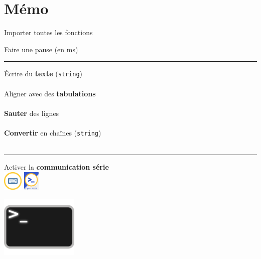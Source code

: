 \section{Mémo \mbpy}
\pagestyle{mbpy}

\begin{methode}[Essentiel]
	Importer toutes les fonctions
	~\hfill {}
	
	Faire une pause {\small(en ms)}
	\hfill {}\\
\end{methode}



\begin{minipage}[t]{0.6\linewidth}
\begin{methode}
	\rule{-0.25em}{2em}
	Écrire du \textbf{texte} (\texttt{string})
	~\hfill {}\\
	~\hfill \ex {}\\
	
	Aligner avec des \textbf{tabulations}
	~\hfill {}\\
	~\hfill \ex {}\\
	
	\textbf{Sauter} des lignes
	~\hfill {} \\
	~\hfill \ex {}\\
	
	\textbf{Convertir} en chaînes (\texttt{string})
	~\hfill {}\\
	~\hfill \ex {}\\
\end{methode}
\end{minipage}
\hfill
\begin{minipage}[t]{0.4\linewidth}
\begin{remarque}
	\rule{-0.25em}{1.7em}
	Activer la \textbf{communication série}\\[0.5em]
	\hfill
	\includegraphics[height=2.5em]{res/ft_repl.png}
	\hfill
	\includegraphics[height=2.5em]{res/ft_01.png}
	\hfill~
\end{remarque}

\begin{center}
	\includegraphics[height=8em]{res/logo-algo.png}
\end{center}
\end{minipage}



